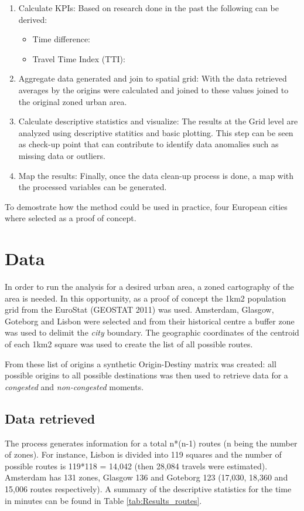 \documentclass[a4paper]{jpconf}
\begin{document}
\begin{enumerate}[label=\arabic*)]
	\item Calculate KPIs: Based on research done in the past the following can be derived:
		\begin{itemize}
			\item Time difference:	
			\item Travel Time Index (TTI):			
		\end{itemize}	
	\item Aggregate data generated and join to spatial grid: With the data retrieved averages by the origins were calculated and joined to these values joined to the original zoned urban area. 
	\item Calculate descriptive statistics and visualize: The results at the Grid level are analyzed using descriptive statitics and basic plotting. This step can be seen as check-up point that can contribute to identify data anomalies such as missing data or outliers. 
	\item Map the results: Finally, once the data clean-up process is done, a map with the processed variables can be generated.
\end{enumerate}

\indent To demostrate how the method could be used in practice, four European cities where selected as a proof of concept.\par

\section{Data} %
\indent In order to run the analysis for a desired urban area, a zoned cartography of the area is needed. In this opportunity, as a proof of concept the 1km2 population grid from the EuroStat (GEOSTAT 2011) was used. Amsterdam, Glasgow, Goteborg and Lisbon were selected and from their historical centre a buffer zone was used to delimit the \textit{city} boundary. The geographic coordinates of the centroid of each 1km2 square was used to create the list of all possible routes. \par
\indent From these list of origins a synthetic Origin-Destiny matrix was created: all possible origins to all possible destinations was then used to retrieve data for a \textit{congested} and \textit{non-congested} moments. 

\subsection{Data retrieved} %
The process generates information for a total n*(n-1) routes (n being the number of zones). For instance, Lisbon is divided into 119 squares and the number of possible routes is 119*118 = 14,042 (then 28,084 travels were estimated). Amsterdam has 131 zones, Glasgow 136 and Goteborg 123 (17,030, 18,360 and 15,006 routes respectively). A summary of the descriptive statistics for the time in minutes can be found in Table \ref{tab:Results_routes}.
\end{document}
